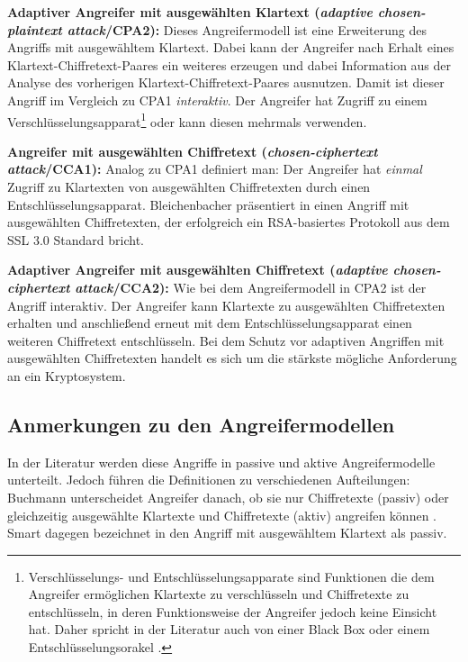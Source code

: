 \textbf{Adaptiver Angreifer mit ausgewählten Klartext (\textit{adaptive chosen-plaintext attack}/CPA2):}
Dieses Angreifermodell ist eine Erweiterung des  Angriffs mit ausgewähltem Klartext. Dabei kann der Angreifer nach Erhalt eines Klartext-Chiffretext-Paares ein weiteres erzeugen und dabei Information aus der Analyse des vorherigen Klartext-Chiffretext-Paares ausnutzen. Damit ist dieser Angriff im Vergleich zu CPA1 \textit{interaktiv}. Der Angreifer hat Zugriff zu einem Verschlüsselungsapparat\footnote{Verschlüsselungs- und Entschlüsselungsapparate sind Funktionen die dem Angreifer ermöglichen Klartexte zu verschlüsseln und Chiffretexte zu entschlüsseln, in deren Funktionsweise der Angreifer jedoch keine Einsicht hat.  Daher spricht in der Literatur auch von einer Black Box \cite[p.291]{smart2003} oder einem Entschlüsselungsorakel \cite[p.2]{bellare1998relations}.} oder kann diesen mehrmals verwenden.

\textbf{Angreifer mit ausgewählten Chiffretext (\textit{chosen-ciphertext attack}/CCA1):}
Analog zu CPA1 definiert man: Der Angreifer hat \textit{einmal} Zugriff zu Klartexten von ausgewählten Chiffretexten durch einen Entschlüsselungsapparat. Bleichenbacher präsentiert in \cite{bleichenbacher1998chosen} einen Angriff mit ausgewählten Chiffretexten, der erfolgreich ein RSA-basiertes Protokoll aus dem SSL 3.0 Standard bricht.

\textbf{Adaptiver Angreifer mit ausgewählten Chiffretext (\textit{adaptive chosen-ciphertext attack}/CCA2):}
Wie bei dem Angreifermodell in CPA2 ist der Angriff interaktiv. Der Angreifer kann Klartexte zu ausgewählten Chiffretexten erhalten und anschließend erneut mit dem Entschlüsselungsapparat einen weiteren Chiffretext entschlüsseln.
Bei dem Schutz vor adaptiven Angriffen mit ausgewählten Chiffretexten handelt es sich um die stärkste mögliche Anforderung an ein Kryptosystem.

\subsection{Anmerkungen zu den Angreifermodellen} 

In der Literatur werden diese Angriffe in passive und aktive Angreifermodelle unterteilt. Jedoch führen die Definitionen zu verschiedenen Aufteilungen: Buchmann unterscheidet Angreifer danach, ob sie nur Chiffretexte (passiv) oder gleichzeitig ausgewählte Klartexte und Chiffretexte (aktiv) angreifen können \cite[p.76]{buchmann2004introduction}. Smart dagegen bezeichnet in \cite[p.291]{smart2003} den Angriff mit ausgewähltem Klartext als passiv.

